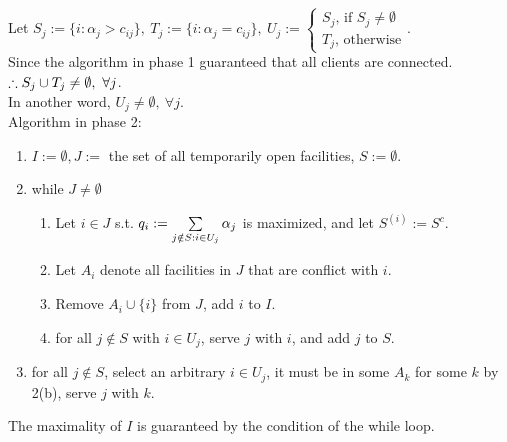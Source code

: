\begin{pr}
Let $S_j:=\{i: \alpha_j>c_{ij}\},\ T_j:=\{i: \alpha_j=c_{ij}\},\ U_j:=\begin{cases}
S_j\text{, if }S_j\neq\emptyset\\
T_j\text{, otherwise}
\end{cases}$.\\
Since the algorithm in phase 1 guaranteed that all clients are connected.\\
$\therefore S_j\cup T_j\neq\emptyset,\ \forall j$.\\
In another word, $U_j\neq\emptyset,\ \forall j$.\\
Algorithm in phase 2:
\begin{enumerate}
\item $I:=\emptyset, J:=$ the set of all temporarily open facilities, $S:=\emptyset$.
\item while $J\neq\emptyset$
\begin{enumerate}
\item Let $i\in J$ s.t. $q_i:=\sum\limits_{j\notin S:i\in U_j}\alpha_j$ is maximized, and let $S^{(i)}:=S^c$.
\item Let $A_i$ denote all facilities in $J$ that are conflict with $i$.
\item Remove $A_i\cup\{i\}$ from $J$, add $i$ to $I$.
\item for all $j\notin S$ with $i\in U_j$, serve $j$ with $i$, and add $j$ to $S$.
\end{enumerate}
\item for all $j\notin S$, select an arbitrary $i\in U_j$, it must be in some $A_k$ for some $k$ by 2(b), serve $j$ with $k$.
\end{enumerate}
The maximality of $I$ is guaranteed by the condition of the while loop.\\

\end{pr}
